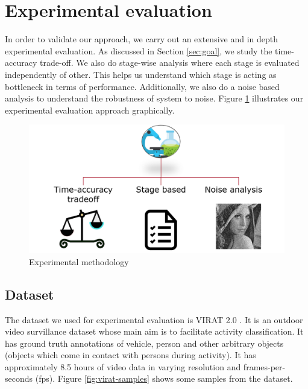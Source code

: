 \section{Experimental evaluation}
In order to validate our approach, we carry out an extensive and in depth experimental evaluation. As discussed in Section \ref{sec:goal}, we study the time-accuracy trade-off. We also do stage-wise analysis where each stage is evaluated independently of other. This helps us understand which stage is acting as bottleneck in terms of performance. Additionally, we also do a noise based analysis to understand the robustness of system to noise. Figure \ref{fig:experimental-methdology} illustrates our experimental evaluation approach graphically. 

\begin{figure}[ht]
    \centering
    \includegraphics[width=\linewidth]{images/experimental-methdology.PNG}
    \caption{Experimental methodology }
    \label{fig:experimental-methdology}
\end{figure}

\subsection{Dataset}
The dataset we used for experimental evaluation is VIRAT 2.0 \cite{virat20}. It is an outdoor video survillance dataset whose main aim is to facilitate activity classification. It has ground truth annotations of vehicle, person and other arbitrary objects (objects which come in contact with persons during activity). It has approximately 8.5 hours of video data in varying resolution and frames-per-seconds (fps). Figure \ref{fig:virat-samples} shows some samples from the dataset. 

